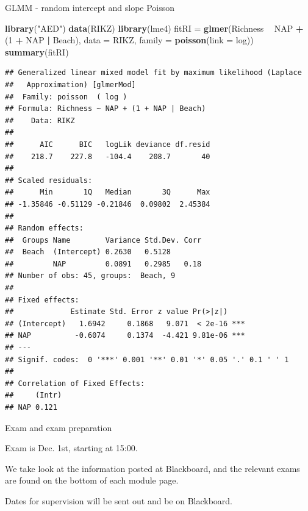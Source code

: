 \documentclass[ignorenonframetext,]{beamer}
\newenvironment{Shaded}{\begin{snugshade}}{\end{snugshade}}
\newcommand{\KeywordTok}[1]{\textcolor[rgb]{0.13,0.29,0.53}{\textbf{#1}}}
\newcommand{\DataTypeTok}[1]{\textcolor[rgb]{0.13,0.29,0.53}{#1}}
\newcommand{\DecValTok}[1]{\textcolor[rgb]{0.00,0.00,0.81}{#1}}
\newcommand{\StringTok}[1]{\textcolor[rgb]{0.31,0.60,0.02}{#1}}
\newcommand{\OperatorTok}[1]{\textcolor[rgb]{0.81,0.36,0.00}{\textbf{#1}}}
\newcommand{\NormalTok}[1]{#1}
\begin{document}
\begin{frame}[fragile]

\begin{block}{GLMM - random intercept and slope Poisson}

\begin{Shaded}
\begin{Highlighting}[]
\KeywordTok{library}\NormalTok{(}\StringTok{"AED"}\NormalTok{)}
\KeywordTok{data}\NormalTok{(RIKZ)}
\KeywordTok{library}\NormalTok{(lme4)}
\NormalTok{fitRI =}\StringTok{ }\KeywordTok{glmer}\NormalTok{(Richness }\OperatorTok{~}\StringTok{ }\NormalTok{NAP }\OperatorTok{+}\StringTok{ }\NormalTok{(}\DecValTok{1} \OperatorTok{+}\StringTok{ }\NormalTok{NAP }\OperatorTok{|}\StringTok{ }\NormalTok{Beach), }\DataTypeTok{data =}\NormalTok{ RIKZ, }\DataTypeTok{family =} \KeywordTok{poisson}\NormalTok{(}\DataTypeTok{link =}\NormalTok{ log))}
\KeywordTok{summary}\NormalTok{(fitRI)}
\end{Highlighting}
\end{Shaded}

\begin{verbatim}
## Generalized linear mixed model fit by maximum likelihood (Laplace
##   Approximation) [glmerMod]
##  Family: poisson  ( log )
## Formula: Richness ~ NAP + (1 + NAP | Beach)
##    Data: RIKZ
## 
##      AIC      BIC   logLik deviance df.resid 
##    218.7    227.8   -104.4    208.7       40 
## 
## Scaled residuals: 
##      Min       1Q   Median       3Q      Max 
## -1.35846 -0.51129 -0.21846  0.09802  2.45384 
## 
## Random effects:
##  Groups Name        Variance Std.Dev. Corr
##  Beach  (Intercept) 0.2630   0.5128       
##         NAP         0.0891   0.2985   0.18
## Number of obs: 45, groups:  Beach, 9
## 
## Fixed effects:
##             Estimate Std. Error z value Pr(>|z|)    
## (Intercept)   1.6942     0.1868   9.071  < 2e-16 ***
## NAP          -0.6074     0.1374  -4.421 9.81e-06 ***
## ---
## Signif. codes:  0 '***' 0.001 '**' 0.01 '*' 0.05 '.' 0.1 ' ' 1
## 
## Correlation of Fixed Effects:
##     (Intr)
## NAP 0.121
\end{verbatim}

\end{block}

\end{frame}

\begin{frame}{Exam and exam preparation}

Exam is Dec. 1st, starting at 15:00. 

We take look at the information posted at Blackboard, and the relevant
exams are found on the bottom of each module page.

Dates for supervision will be sent out and be on Blackboard.

\end{frame}
\end{document}
